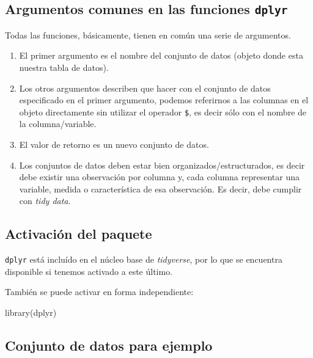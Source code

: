 \documentclass[
  spanish,
  letterpaper,
  DIV=11,
  numbers=noendperiod]{scrreprt}
\newenvironment{Shaded}{\begin{snugshade}}{\end{snugshade}}
\newcommand{\FunctionTok}[1]{\textcolor[rgb]{0.28,0.35,0.67}{#1}}
\newcommand{\NormalTok}[1]{\textcolor[rgb]{0.00,0.23,0.31}{#1}}
\begin{document}
\subsection{\texorpdfstring{Argumentos comunes en las funciones
\textbf{\texttt{dplyr}}}{Argumentos comunes en las funciones dplyr}}\label{argumentos-comunes-en-las-funciones-dplyr}

Todas las funciones, básicamente, tienen en común una serie de
argumentos.

\begin{enumerate}
\def\labelenumi{\arabic{enumi}.}
\item
  El primer argumento es el nombre del conjunto de datos (objeto donde
  esta nuestra tabla de datos).
\item
  Los otros argumentos describen que hacer con el conjunto de datos
  especificado en el primer argumento, podemos referirnos a las columnas
  en el objeto directamente sin utilizar el operador \texttt{\$}, es
  decir sólo con el nombre de la columna/variable.
\item
  El valor de retorno es un nuevo conjunto de datos.
\item
  Los conjuntos de datos deben estar bien organizados/estructurados, es
  decir debe existir una observación por columna y, cada columna
  representar una variable, medida o característica de esa observación.
  Es decir, debe cumplir con \emph{tidy data}.
\end{enumerate}

\subsection{Activación del paquete}\label{activaciuxf3n-del-paquete}

\texttt{dplyr} está incluído en el núcleo base de \emph{tidyverse}, por
lo que se encuentra disponible si tenemos activado a este último.

También se puede activar en forma independiente:

\begin{Shaded}
\begin{Highlighting}[]
\FunctionTok{library}\NormalTok{(dplyr)}
\end{Highlighting}
\end{Shaded}

\subsection{Conjunto de datos para
ejemplo}\label{conjunto-de-datos-para-ejemplo}
\end{document}
